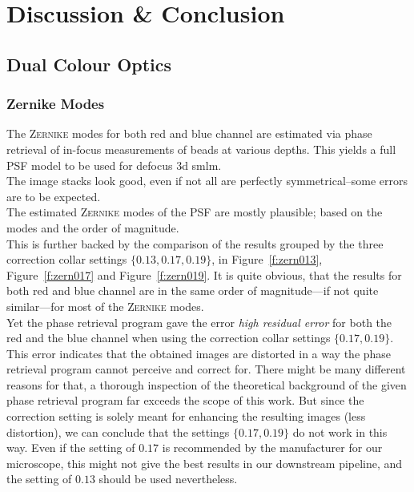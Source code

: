 \documentclass[11pt, a4paper, oneside, twocolumn]{report}
\newcommand{\e}{\emph}
\begin{document}
\twocolumn

\clearpage\chapter{Discussion \& Conclusion}


\section{Dual Colour Optics}


\subsection{Zernike Modes}


The \textsc{Zernike} modes for both red and blue channel are estimated
via phase retrieval of in-focus measurements of beads at various
depths. This yields a full PSF model to be used for defocus 3d
\gls{smlm}.\\

The image stacks look good, even if not all are perfectly
symmetrical--some errors are to be expected.\\

The estimated \textsc{Zernike} modes of the PSF are mostly plausible;
based on the modes and the order of magnitude.\\

This is further backed by the comparison of the results grouped by the
three correction collar settings $\{0.13,0.17,0.19\}$, in
Figure~\ref{f:zern013}, Figure~\ref{f:zern017} and
Figure~\ref{f:zern019}. It is quite obvious, that the results for both
red and blue channel are in the same order of magnitude---if not quite
similar---for most of the \textsc{Zernike} modes.\\

Yet the phase retrieval program gave the error \e{high residual error}
for both the red and the blue channel when using the correction collar
settings $\{0.17,0.19\}$. This error indicates that the obtained
images are distorted in a way the phase retrieval program cannot
perceive and correct for. There might be many different reasons for
that, a thorough inspection of the theoretical background of the given
phase retrieval program far exceeds the scope of this work. But since
the correction setting is solely meant for enhancing the resulting
images (less distortion), we can conclude that the settings
$\{0.17,0.19\}$ do not work in this way. Even if the setting of $0.17$
is recommended by the manufacturer for our microscope, this might not
give the best results in our downstream pipeline, and the setting of
$0.13$ should be used nevertheless.
\end{document}
